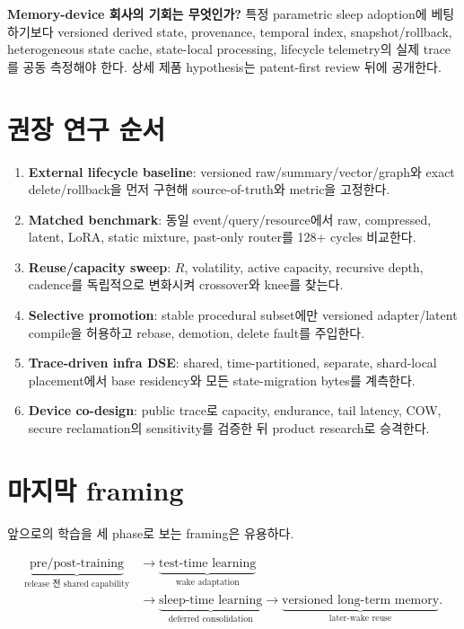 \textbf{Memory-device 회사의 기회는 무엇인가?} 특정 parametric sleep adoption에 베팅하기보다 versioned
derived state, provenance, temporal index, snapshot/rollback, heterogeneous state cache, state-local processing,
lifecycle telemetry의 실제 trace를 공동 측정해야 한다. 상세 제품 hypothesis는 patent-first review 뒤에
공개한다.

\section{권장 연구 순서}

\begin{enumerate}
  \item \textbf{External lifecycle baseline}: versioned raw/summary/vector/graph와 exact delete/rollback을 먼저
  구현해 source-of-truth와 metric을 고정한다.
  \item \textbf{Matched benchmark}: 동일 event/query/resource에서 raw, compressed, latent, LoRA, static
  mixture, past-only router를 128+ cycles 비교한다.
  \item \textbf{Reuse/capacity sweep}: $R$, volatility, active capacity, recursive depth, cadence를 독립적으로
  변화시켜 crossover와 knee를 찾는다.
  \item \textbf{Selective promotion}: stable procedural subset에만 versioned adapter/latent compile을 허용하고
  rebase, demotion, delete fault를 주입한다.
  \item \textbf{Trace-driven infra DSE}: shared, time-partitioned, separate, shard-local placement에서 base
  residency와 모든 state-migration bytes를 계측한다.
  \item \textbf{Device co-design}: public trace로 capacity, endurance, tail latency, COW, secure reclamation의
  sensitivity를 검증한 뒤 product research로 승격한다.
\end{enumerate}

\section{마지막 framing}

앞으로의 학습을 세 phase로 보는 framing은 유용하다.

\begin{align*}
\underbrace{\text{pre/post-training}}_{\text{release 전 shared capability}}
&\rightarrow
\underbrace{\text{test-time learning}}_{\text{wake adaptation}}\\
&\rightarrow
\underbrace{\text{sleep-time learning}}_{\text{deferred consolidation}}
\rightarrow
\underbrace{\text{versioned long-term memory}}_{\text{later-wake reuse}}.
\end{align*}

